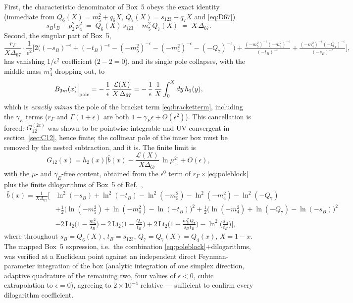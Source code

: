 \documentclass[11pt]{article}
\newcommand{\Li}{\mathrm{Li}}
\newcommand{\eps}{\epsilon}
\begin{document}
First, the characteristic denominator of Box~5 obeys the exact identity (immediate from
$Q_6(X)=m_5^2+q_6X$, $Q_7(X)=s_{123}+q_7X$ and \eqref{eq:D67})
\begin{equation}
s_Bt_B-p_2^2\,p_4^2\;=\;Q_6(X)\,s_{123}-m_5^2\,Q_7(X)\;=\;X\,\Delta_{67} .
\label{eq:XD}
\end{equation}
Second, the singular part of Box~5,
\begin{equation}
\frac{r_\Gamma}{X\Delta_{67}}\cdot\frac{1}{\eps^{2}}
\Big[2\big((-s_B)^{-\eps}+(-t_B)^{-\eps}-(-m_5^2)^{-\eps}-(-m_4^2)^{-\eps}-(-Q_7)^{-\eps}\big)
+\tfrac{(-m_5^2)^{-\eps}(-m_4^2)^{-\eps}}{(-t_B)^{-\eps}}
+\tfrac{(-m_4^2)^{-\eps}(-Q_7)^{-\eps}}{(-s_B)^{-\eps}}\Big],
\label{eq:poleblock}
\end{equation}
has vanishing $1/\eps^2$ coefficient ($2-2=0$), and its single pole collapses, with the middle
mass $m_4^2$ dropping out, to
\begin{equation}
B_{3m}(x)\Big|_{\rm pole}
=-\,\frac{1}{\eps}\,\frac{\mathcal{L}(X)}{X\,\Delta_{67}}
=-\,\frac{1}{\eps}\,\frac{1}{X}\int_0^X dy\,h_1(y) ,
\end{equation}
which is \emph{exactly minus} the pole of the bracket term \eqref{eq:bracketterm}, including the
$\gamma_E$ terms ($r_\Gamma$ and $\Gamma(1+\eps)$ are both $1-\gamma_E\eps+O(\eps^2)$). This
cancellation is forced: $G^{(2c)}_{12}$ was shown to be pointwise integrable and UV convergent in
section~\ref{sec:C12}, hence finite; the collinear pole of the inner box must be removed by the
nested subtraction, and it is. The finite limit is
\begin{equation}
G_{12}(x)=h_2(x)\Big[\hat b(x)-\frac{\mathcal{L}(X)}{X\Delta_{67}}\,\ln\mu^{2}\Big]+O(\eps),
\label{eq:G12fin}
\end{equation}
with the $\mu$- and $\gamma_E$-free content, obtained from the $\eps^0$ term of
$r_\Gamma\times$\eqref{eq:poleblock} plus the finite dilogarithms of Box~5 of Ref.~\cite{EZ},
\begin{equation}
\begin{aligned}
\hat b(x)=\frac{1}{X\Delta_{67}}\Big[&
\ln^{2}(-s_B)+\ln^{2}(-t_B)-\ln^{2}(-m_5^2)-\ln^{2}(-m_4^2)-\ln^{2}(-Q_7)\\
&+\tfrac12\big(\ln(-m_5^2)+\ln(-m_4^2)-\ln(-t_B)\big)^{2}
+\tfrac12\big(\ln(-m_4^2)+\ln(-Q_7)-\ln(-s_B)\big)^{2}\\
&-2\,\Li_2\Big(1-\tfrac{m_5^2}{s_B}\Big)
-2\,\Li_2\Big(1-\tfrac{Q_7}{t_B}\Big)
+2\,\Li_2\Big(1-\tfrac{m_5^2\,Q_7}{s_B\,t_B}\Big)
-\ln^{2}\Big(\tfrac{s_B}{t_B}\Big)\Big],
\end{aligned}
\label{eq:bhat}
\end{equation}
where throughout $s_B=Q_6(X)$, $t_B=s_{123}$, $Q_7=Q_7(X)=Q_4(x)$, $X=1-x$. The mapped Box~5
expression, i.e.\ the combination \eqref{eq:poleblock}$+$dilogarithms, was verified at a Euclidean
point against an independent direct Feynman-parameter integration of the box (analytic integration
of one simplex direction, adaptive quadrature of the remaining two, four values of $\eps<0$, cubic
extrapolation to $\eps=0$), agreeing to $2\times10^{-4}$ relative --- sufficient to confirm every
dilogarithm coefficient.
\end{document}
